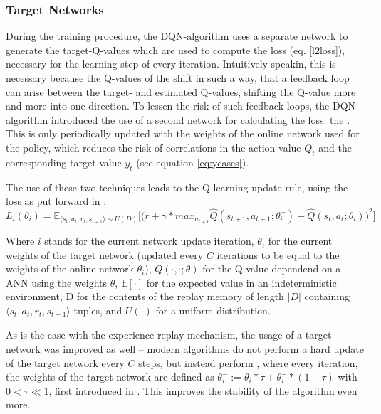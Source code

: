 \subsubsection*{Target Networks}
During the training procedure, the DQN-algorithm uses a separate network to generate the target-Q-values which are used to compute the loss (eq. \ref{l2loss}), necessary for the learning step of every iteration. Intuitively speakin, this is necessary because the Q-values of the  shift in such a way, that a feedback loop can arise between the target- and estimated Q-values, shifting the Q-value more and more into one direction. %
To lessen the risk of such feedback loops, the DQN algorithm introduced the use of a second network for calculating the loss: the . This is only periodically updated with the weights of the online network used for the policy, which reduces the risk of correlations in the action-value $Q_t$ and the corresponding target-value $y_t$ (see equation \ref{eq:ycases}).

The use of these two techniques leads to the Q-learning update rule, using the loss as put forward in \cite{mnih_human-level_2015}:
\begin{equation} \label{qloss_target}
	L_i(\theta_i) = \mathds{E}_{\langle s_t,a_t,r_t,s_{t+1} \rangle \sim U(D)} \Bigg[\Big( r + \gamma * max_{a_{t+1}} \hat{Q}(s_{t+1}, a_{t+1}; \theta^-_i) - \hat{Q}(s_t,a_t;\theta_i) \Big)^2\Bigg]
\end{equation}
\begin{flushright}
	\scriptsize
	Where $i$ stands for the current network update iteration, $\theta_i$ for the current weights of the target network (updated every $C$ iterations to be equal to the weights of the online network $\theta_i$), $Q(\cdot,\cdot;\theta)$ for the Q-value dependend on a ANN using the weights $\theta$, $\mathds{E}[\cdot]$ for the expected value in an indeterministic environment, D for the contents of the replay memory of length $\lvert D \rvert$ containing $\langle s_t,a_t,r_t,s_{t+1} \rangle$-tuples, and $U(\cdot)$ for a uniform distribution.
\end{flushright}
As is the case with the experience replay mechanism, the usage of a target network was improved as well -- modern algorithms do not perform a hard update of the target network every $C$ steps, but instead perform , where every iteration, the weights of the target network are defined as $\theta^-_i := \theta_i * \tau + \theta^-_i * (1-\tau)$ with $0 < \tau \ll 1$, first introduced in \cite{lillicrap_continuous_2015}. This improves the stability of the algorithm even more.\\

